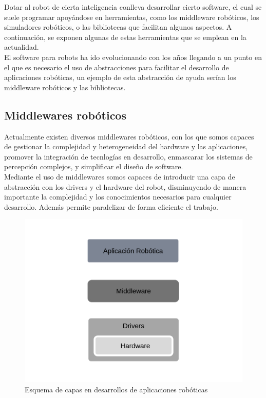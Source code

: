 Dotar al robot de cierta inteligencia conlleva desarrollar cierto software, el cual se suele programar apoyándose en herramientas, como los middleware robóticos, los simuladores robóticos, o las  bibliotecas que facilitan algunos aspectos. A continuación, se exponen algunas de estas herramientas que se emplean en la actualidad.\\

El software para robots ha ido evolucionando con los años llegando a un punto en el que es necesario el uso de abstracciones para facilitar el desarrollo de aplicaciones robóticas, un ejemplo de esta abstracción de ayuda serían los middleware robóticos y las bibliotecas.
 

\subsection{Middlewares robóticos}

Actualmente existen diversos middlewares robóticos, con los que somos capaces de gestionar la complejidad y heterogeneidad del hardware y las aplicaciones, promover la integración de tecnlogías en desarrollo, enmascarar los sistemas de percepción complejos, y simplificar el diseño de software.\\

Mediante el uso de middlewares somos capaces de introducir una capa de abstracción con los drivers y el hardware del robot, disminuyendo de manera importante la complejidad y los conocimientos necesarios para cualquier desarrollo. Además permite paralelizar de forma eficiente el trabajo.\\

\begin{figure}[H]
    	\centering
     	\includegraphics[scale=0.40]{img/middleware.png}
  		\caption{Esquema de capas en desarrollos de aplicaciones robóticas}
  		\label{fig:middleware}
\end{figure}

